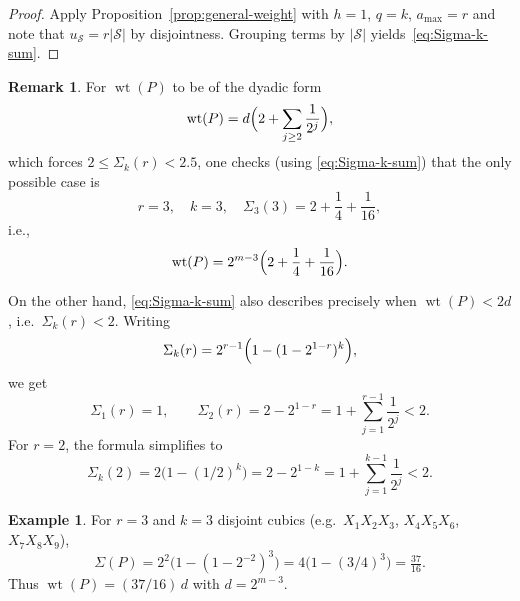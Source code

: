 \documentclass[conference]{IEEEtran}
\theoremstyle{definition}
\newtheorem{example}{Example}
\newtheorem{remark}{Remark}
\newcommand{\wt}{\operatorname{wt}}
\begin{document}
\begin{proof}

Apply Proposition~\ref{prop:general-weight} with $h=1$, $q=k$, $a_{\max}=r$ and note that $u_{\mathcal S}=r|\mathcal S|$ by disjointness. Grouping terms by $|\mathcal S|$ yields~\eqref{eq:Sigma-k-sum}.
\end{proof}


\begin{remark}
\label{rem:dyadic-2-plus}
For $\wt(P)$ to be of the dyadic form
\[
  \wt(P) = d\Bigl(2 + \sum_{j\ge 2}\frac{1}{2^j}\Bigr),
\]
which forces $2 \le \Sigma_k(r) < 2.5$, one checks (using
\eqref{eq:Sigma-k-sum}) that the only possible case is
\[
  r=3,\quad k=3,\quad
  \Sigma_3(3) = 2 + \frac14 + \frac1{16},
\]
i.e.,
\[
  \wt(P) = 2^{m-3}\Bigl(2 + \frac14 + \frac1{16}\Bigr).
\]

On the other hand, \eqref{eq:Sigma-k-sum} also describes precisely when
$\wt(P)<2d$, i.e.\ $\Sigma_k(r)<2$. Writing
\[
  \Sigma_k(r) = 2^{r-1}\Bigl(1-(1-2^{1-r})^k\Bigr),
\]
we get
\[
  \Sigma_1(r) = 1,\qquad
  \Sigma_2(r) = 2 - 2^{1-r}
               = 1 + \sum_{j=1}^{r-1}\frac{1}{2^j}
               < 2.
\]
For $r=2$, the formula simplifies to
\[
  \Sigma_k(2) = 2\bigl(1-(1/2)^k\bigr)
              = 2 - 2^{1-k}
              = 1 + \sum_{j=1}^{k-1}\frac{1}{2^j} < 2.
\]
\end{remark}


\begin{example}
For $r=3$ and $k=3$ disjoint cubics (e.g.\ $X_1X_2X_3$, $X_4X_5X_6$, $X_7X_8X_9$),
\[
\Sigma(P) = 2^{2}\big(1-(1-2^{-2})^3\big)
= 4\big(1-(3/4)^3\big)
= \tfrac{37}{16}.
\]
Thus $\wt(P) = (37/16)\,d$ with $d=2^{m-3}$.
\end{example}
\end{document}

